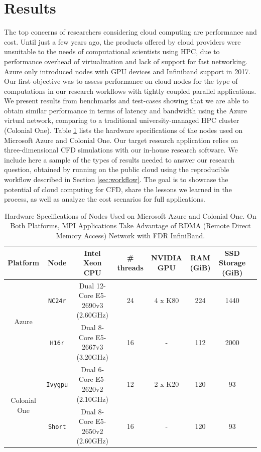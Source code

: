 \documentclass[10pt,journal,compsoc]{IEEEtran}
\begin{document}
\section{Results}\label{sec:results}

The top concerns of researchers considering cloud computing are performance and cost. 
Until just a few years ago, the products offered by cloud providers were unsuitable to the needs of computational scientists using HPC, due to performance overhead of virtualization and lack of support for fast networking. 
Azure only introduced nodes with GPU devices and Infiniband support in 2017. 
Our first objective was to assess performance on cloud nodes for the type of computations in our research workflows with  tightly coupled parallel applications. 
We present results from benchmarks and test-cases showing that we are able to obtain similar performance in terms of latency and bandwidth using the Azure virtual network, comparing to a traditional university-managed HPC cluster (Colonial One).
Table \ref{tab:hw_specs} lists the hardware specifications of the nodes used on Microsoft Azure and Colonial One.
 Our target research application relies on three-dimensional CFD simulations with our in-house research software. We include here a sample of the types of results needed to answer our research question, obtained by running on the public cloud using the reproducible workflow described in Section \ref{sec:workflow}. 
 The goal is to showcase the potential of cloud computing for CFD, share the lessons we learned in the process, as well as analyze the cost scenarios for full applications.


\begin{table}[b]
    \renewcommand{\arraystretch}{1.5}
    \caption{Hardware Specifications of Nodes Used on Microsoft Azure and Colonial One. On Both Platforms, MPI Applications Take Advantage of RDMA (Remote Direct Memory Access) Network with FDR InfiniBand.}
    \label{tab:hw_specs}
    \centering
    \begin{tabular}{cccccccc}
        Platform & Node & Intel Xeon CPU & \# threads & NVIDIA GPU & RAM (GiB) & SSD Storage (GiB) \\
        \hline
        \multirow{2}{*}{Azure} & \texttt{NC24r} & Dual 12-Core E5-2690v3 (2.60GHz) & 24 & 4 x K80 & 224 & 1440 \\
        & \texttt{H16r} & Dual 8-Core E5-2667v3 (3.20GHz) & 16 & - & 112 & 2000 \\
        \hline
        \multirow{2}{*}{Colonial One} & \texttt{Ivygpu} & Dual 6-Core E5-2620v2 (2.10GHz) & 12 & 2 x K20 & 120 & 93 \\
        & \texttt{Short} & Dual 8-Core E5-2650v2 (2.60GHz) & 16 & - & 120 & 93 \\
        \hline
    \end{tabular}
\end{table}
\end{document}
